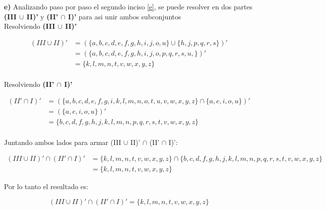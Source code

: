 \newpage

\textbf{e)} Analizando paso por paso el segundo inciso \ref{e}, se puede resolver en dos partes \textbf{(III $\cup$ II)'} y \textbf{(II' $\cap$ I)' } para asi unir ambos subconjuntos \\

Resolviendo \textbf{(III $\cup$ II)' }

\begin{align*}
(III \cup II)'   &= (\{ a, b, c, d, e, f, g, h, i, j, o, u  \}  \cup \{ h, j, p, q, r, s  \})' \\
  &=    (\{ a, b, c, d, e, f, g, h, i, j, o, p, q, r, s, u, \})'      \\
  &=   \{  k, l, m, n, t, v, w, x, y, z \}      \\
\end{align*}

Resolviendo \textbf{(II' $\cap$ I)' }

\begin{align*}
(II' \cap I)'   &= ( \{ a, b, c, d, e, f, g, i, k, l, m, n, o, t, u, v, w, x, y, z \} \cap \{a, e, i, o, u\} )' \\
  &=    (\{a, e, i, o, u\})'      \\
  &=  \{ b, c, d, f, g, h, j, k, l, m, n, p, q, r, s, t, v, w, x, y, z \}      \\
\end{align*}

Juntando ambos lados para armar (III $\cup$ II)' $\cap$ (II' $\cap$ I)':

\begin{align*}
(III \cup II)' \cap (II' \cap I)'  &= \{  k, l, m, n, t, v, w, x, y, z \} \cap \{ b, c, d, f, g, h, j, k, l, m, n, p, q, r, s, t, v, w, x, y, z \}  \\
  &= \{ k, l, m, n, t,  v, w, x, y, z \}
\end{align*}

Por lo tanto el resultado es:

\begin{equation*}
    \boxed{(III \cup II)' \cap (II' \cap I)'  =   \{ k, l, m, n, t,  v, w, x, y, z \}   }
\end{equation*}